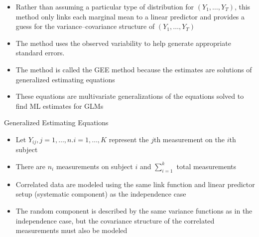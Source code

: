 \documentclass{beamer}
\begin{document}
\begin{frame}
\begin{itemize}
\item Rather than assuming a particular type of distribution for $(Y_1, \dots, Y_T)$, this method only links each marginal mean to a linear predictor and provides a guess for the variance–covariance structure of $(Y_1, \dots, Y_T)$ \vspace{0.25cm}
\item The method uses the observed variability to help generate appropriate standard errors. \vspace{0.25cm}
\item The method is called the GEE method because the estimates are solutions of generalized estimating equations \vspace{0.25cm}
\item These equations are multivariate generalizations of the equations solved to find ML estimates for GLMs
\end{itemize}
\end{frame}

\begin{frame}{Generalized Estimating Equations}
\begin{itemize}
	\item Let $Y_{ij}, j = 1, \dots ,n. i = 1, \dots, K$ represent the $j$th	measurement on the $i$th subject
	\item There are $n_i$ measurements on subject $i$ and $\sum_{i=1}^{k}$ total measurements
	\item Correlated data are modeled using the same link function and linear predictor setup (systematic component) as the independence case
	\item The random component is described by the same variance functions as in the
	independence case, but the covariance structure of the correlated measurements must also be modeled

\end{itemize}
\end{frame}
\end{document}
